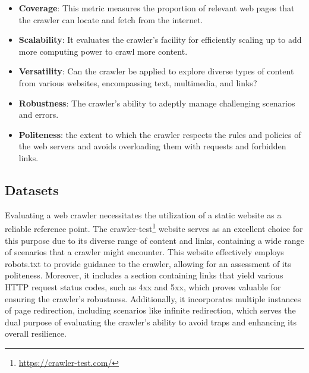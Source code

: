 {\renewcommand\labelitemi{}
\begin{itemize}
  \item \textbf{Coverage}: This metric measures the proportion of relevant web pages that the crawler can locate and fetch from the internet.

  \item \textbf{Scalability}: It evaluates the crawler's facility for efficiently scaling up to add more computing power to crawl more content.

  \item \textbf{Versatility}: Can the crawler be applied to explore diverse types of content from various websites, encompassing text, multimedia, and links?

  \item \textbf{Robustness}: The crawler's ability to adeptly manage challenging scenarios and errors.

  \item \textbf{Politeness}:  the extent to which the crawler respects the rules and policies of the web servers and avoids overloading them with requests and forbidden links.

\end{itemize}

\subsection{Datasets} 
Evaluating a web crawler necessitates the utilization of a static website as a reliable reference point. The crawler-test\footnote{\url{https://crawler-test.com/}} website serves as an excellent choice for this purpose due to its diverse range of content and links, containing a wide range of scenarios that a crawler might encounter. This website effectively employs robots.txt to provide guidance to the crawler, allowing for an assessment of its politeness. Moreover, it includes a section containing links that yield various HTTP request status codes, such as 4xx and 5xx, which proves valuable for ensuring the crawler's robustness. Additionally, it incorporates multiple instances of page redirection, including scenarios like infinite redirection, which serves the dual purpose of evaluating the crawler's ability to avoid traps and enhancing its overall resilience.

}
